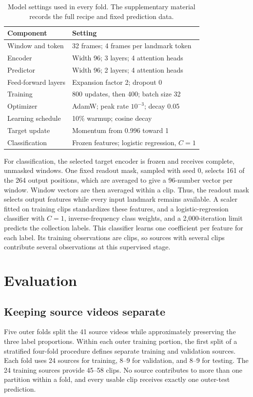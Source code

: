 \documentclass[10pt,twocolumn,letterpaper]{article}
\begin{document}
\begin{table}[t]
\centering
\caption{Model settings used in every fold. The supplementary material records the full recipe and fixed prediction data.}
\label{tab:settings}
\small\setlength{\tabcolsep}{4pt}
\begin{tabular}{lp{1.88in}}
\toprule
Component & Setting\\
\midrule
Window and token & 32 frames; 4 frames per landmark token\\
Encoder & Width 96; 3 layers; 4 attention heads\\
Predictor & Width 96; 2 layers; 4 attention heads\\
Feed-forward layers & Expansion factor 2; dropout 0\\
Training & 800 updates, then 400; batch size 32\\
Optimizer & AdamW; peak rate $10^{-3}$; decay 0.05\\
Learning schedule & 10\% warmup; cosine decay\\
Target update & Momentum from 0.996 toward 1\\
Classification & Frozen features; logistic regression, $C=1$\\
\bottomrule
\end{tabular}
\end{table}

For classification, the selected target encoder is frozen and receives complete, unmasked windows. One fixed readout mask, sampled with seed 0, selects 161 of the 264 output positions, which are averaged to give a 96-number vector per window. Window vectors are then averaged within a clip. Thus, the readout mask selects output features while every input landmark remains available. A scaler fitted on training clips standardizes these features, and a logistic-regression classifier with $C=1$, inverse-frequency class weights, and a 2,000-iteration limit predicts the collection labels. This classifier learns one coefficient per feature for each label. Its training observations are clips, so sources with several clips contribute several observations at this supervised stage.

\section{Evaluation}
\subsection{Keeping source videos separate}
Five outer folds split the 41 source videos while approximately preserving the three label proportions. Within each outer training portion, the first split of a stratified four-fold procedure defines separate training and validation sources. Each fold uses 24 sources for training, 8--9 for validation, and 8--9 for testing. The 24 training sources provide 45--58 clips. No source contributes to more than one partition within a fold, and every usable clip receives exactly one outer-test prediction.
\end{document}
